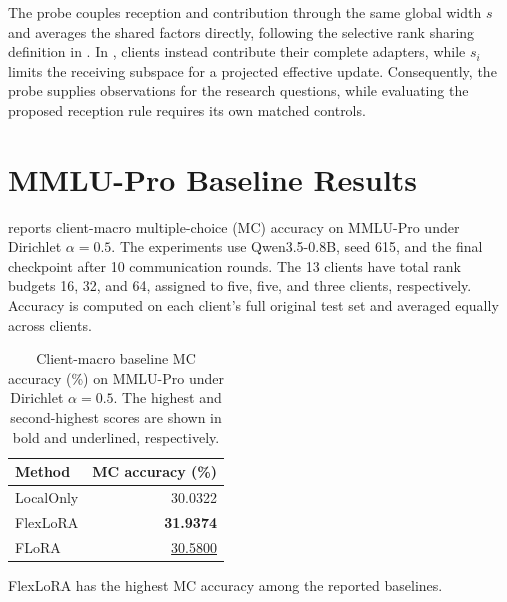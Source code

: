 The probe couples reception and contribution through the same global width $s$ and averages the shared factors directly, following the selective rank sharing definition in .
In , clients instead contribute their complete adapters, while $s_i$ limits the receiving subspace for a projected effective update.
Consequently, the probe supplies observations for the research questions, while evaluating the proposed reception rule requires its own matched controls.

\section{MMLU-Pro Baseline Results}
\label{sec:appendix:mmlu-baselines}

 reports client-macro multiple-choice (MC) accuracy on MMLU-Pro under Dirichlet $\alpha=0.5$.
The experiments use Qwen3.5-0.8B, seed 615, and the final checkpoint after 10 communication rounds.
The 13 clients have total rank budgets 16, 32, and 64, assigned to five, five, and three clients, respectively.
Accuracy is computed on each client's full original test set and averaged equally across clients.

\begin{table}[t]
\centering
\small
\setlength{\tabcolsep}{4pt}
\caption{Client-macro baseline MC accuracy (\%) on MMLU-Pro under Dirichlet $\alpha=0.5$.
The highest and second-highest scores are shown in bold and underlined, respectively.}
\label{tab:exp-mmlu-dir05}
\begin{tabular}{lr}
\toprule
\textbf{Method} & \textbf{MC accuracy (\%)} \\
\midrule
LocalOnly                          & 30.0322 \\
FlexLoRA                           & \textbf{31.9374} \\
FLoRA                              & \underline{30.5800} \\
\bottomrule
\end{tabular}
\end{table}

FlexLoRA has the highest MC accuracy among the reported baselines.

